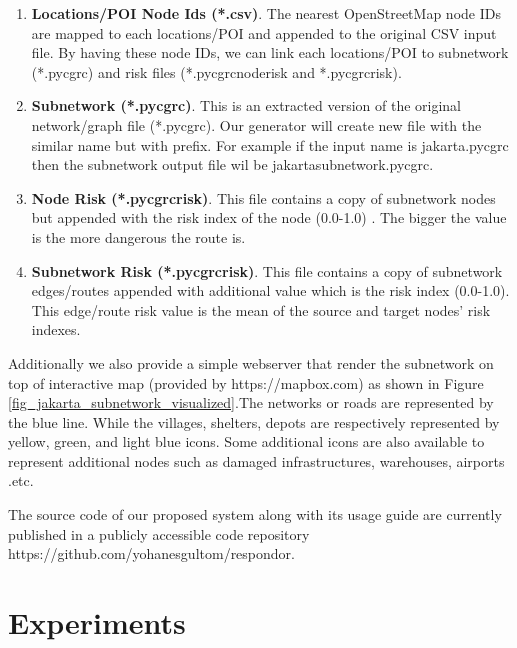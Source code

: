 \documentclass[conference]{IEEEtran}
\begin{document}
\begin{enumerate}

\item \textbf{Locations/POI Node Ids (*.csv)}. The nearest OpenStreetMap node IDs are mapped to each locations/POI and appended to the original CSV input file. By having these node IDs, we can link each locations/POI to subnetwork (*.pycgrc) and risk files (*.pycgrc\textunderscore node\textunderscore risk and *.pycgrc\textunderscore risk).

\item \textbf{Subnetwork (*.pycgrc)}. This is an extracted version of the original network/graph file (*.pycgrc). Our generator will create new file with the similar name but with prefix. For example if the input name is jakarta.pycgrc then the subnetwork output file wil be jakarta\textunderscore subnetwork.pycgrc.

\item \textbf{Node Risk (*.pycgrc\textunderscore risk)}. This file contains a copy of subnetwork nodes but appended with the risk index of the node (0.0-1.0) . The bigger the value is the more dangerous the route is.

\item \textbf{Subnetwork Risk (*.pycgrc\textunderscore risk)}. This file contains a copy of subnetwork edges/routes appended with additional value which is the risk index (0.0-1.0). This edge/route risk value is the mean of the source and target nodes' risk indexes.

\end{enumerate}

Additionally we also provide a simple webserver that render the subnetwork on top of interactive map (provided by https://mapbox.com) as shown in Figure \ref{fig_jakarta_subnetwork_visualized}.The networks or roads are represented by the blue line. While the villages, shelters, depots are respectively represented by yellow, green, and light blue icons. Some additional icons are also available to represent additional nodes such as damaged infrastructures, warehouses, airports .etc.

The source code of our proposed system along with its usage guide are currently published in a publicly accessible code repository https://github.com/yohanesgultom/respondor.

\section{Experiments}
\end{document}
